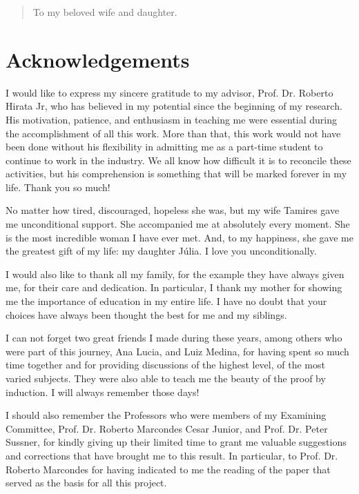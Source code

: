 \documentclass[12pt,twoside,a4paper]{book}
\theoremstyle{plain}
\theoremstyle{definition}
\newenvironment{dedication}
     {\vspace{6ex}\begin{quotation}\begin{center}\begin{em}}
     {\par\end{em}\end{center}\end{quotation}}
\begin{document}

\begin{dedication}
To my beloved wife and daughter.
\end{dedication}


\chapter*{Acknowledgements}
I would like to express my sincere gratitude to my advisor, Prof. Dr. Roberto Hirata Jr, who has believed in my potential since the beginning of my research. His motivation, patience, and enthusiasm in teaching me were essential during the accomplishment of all this work. More than that, this work would not have been done without his flexibility in admitting me as a part-time student to continue to work in the industry. We all know how difficult it is to reconcile these activities, but his comprehension is something that will be marked forever in my life. Thank you so much!

No matter how tired, discouraged, hopeless she was, but my wife Tamires gave me unconditional support. She accompanied me at absolutely every moment. She is the most incredible woman I have ever met. And, to my happiness, she gave me the greatest gift of my life: my daughter Júlia. I love you unconditionally.

I would also like to thank all my family, for the example they have always given me, for their care and dedication. In particular, I thank my mother for showing me the importance of education in my entire life. I have no doubt that your choices have always been thought the best for me and my siblings.

I can not forget two great friends I made during these years, among others who were part of this journey, Ana Lucia, and Luiz Medina, for having spent so much time together and for providing discussions of the highest level, of the most varied subjects. They were also able to teach me the beauty of the proof by induction. I will always remember those days!

I should also remember the Professors who were members of my Examining Committee, Prof. Dr. Roberto Marcondes Cesar Junior, and Prof. Dr. Peter Sussner, for kindly giving up their limited time to grant me valuable suggestions and corrections that have brought me to this result. In particular, to Prof. Dr. Roberto Marcondes for having indicated to me the reading of the paper that served as the basis for all this project.
\end{document}
